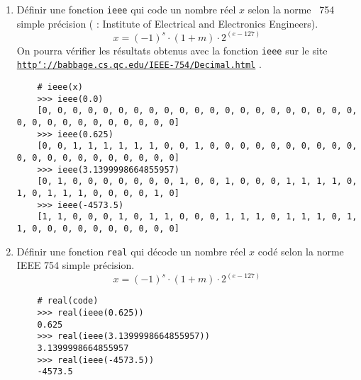 \begin{td}\label{td:ieee754}
\em
\begin{enumerate}
\item Définir une fonction {\tt ieee} qui code
	un nombre réel $x$ selon la norme \ieee\ 754 simple précision
	(\href{http://www.ieee.org}{\ieee} : Institute of Electrical and Electronics Engineers).
	$$x = (-1)^s\cdot (1+m)\cdot 2^{(e-127)}$$
	On pourra vérifier les résultats obtenus avec la fonction {\tt ieee}
	sur le site
	\href{http://babbage.cs.qc.edu/IEEE-754/Decimal.html}{\tt http\char`://babbage.cs.qc.edu/IEEE-754/Decimal.html} .

	\begin{py}{7cm}
	\begin{verbatim}
	# ieee(x)
	>>> ieee(0.0)
	[0, 0, 0, 0, 0, 0, 0, 0, 0, 0, 0, 0, 0, 0, 0, 0, 0, 0, 0, 0, 0, 0, 0, 0, 0, 0, 0, 0, 0, 0, 0, 0]
	>>> ieee(0.625)
	[0, 0, 1, 1, 1, 1, 1, 1, 0, 0, 1, 0, 0, 0, 0, 0, 0, 0, 0, 0, 0, 0, 0, 0, 0, 0, 0, 0, 0, 0, 0, 0]
	>>> ieee(3.1399998664855957)
	[0, 1, 0, 0, 0, 0, 0, 0, 0, 1, 0, 0, 1, 0, 0, 0, 1, 1, 1, 1, 0, 1, 0, 1, 1, 1, 0, 0, 0, 0, 1, 0]
	>>> ieee(-4573.5)
	[1, 1, 0, 0, 0, 1, 0, 1, 1, 0, 0, 0, 1, 1, 1, 0, 1, 1, 1, 0, 1, 1, 0, 0, 0, 0, 0, 0, 0, 0, 0, 0]
	\end{verbatim}
	\end{py}
	\vspace*{1mm}
	
\item Définir une fonction {\tt real} qui décode un nombre réel $x$ 
	codé selon la norme IEEE 754 simple précision.
	$$x = (-1)^s\cdot (1+m)\cdot 2^{(e-127)}$$

	\begin{py}{7cm}
	\begin{verbatim}
	# real(code)
	>>> real(ieee(0.625))
	0.625
	>>> real(ieee(3.1399998664855957))
	3.1399998664855957
	>>> real(ieee(-4573.5))
	-4573.5
	\end{verbatim}
	\end{py}
\end{enumerate}
\end{td}

